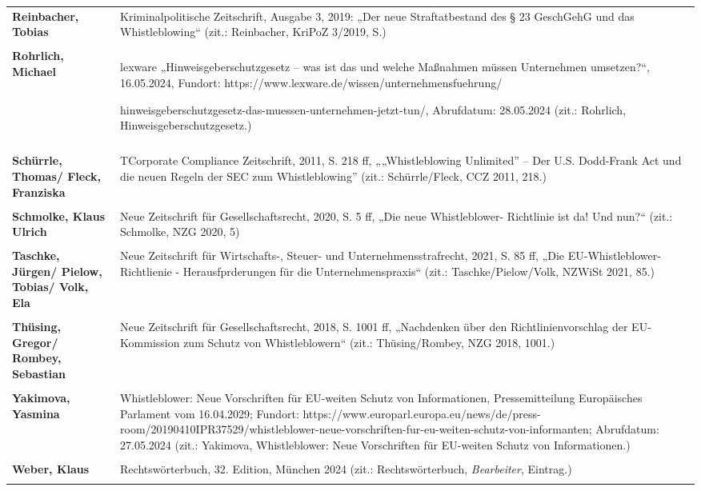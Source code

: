 \begin{longtable}{R{5 cm}R{8,5 cm}}
    \textbf{Reinbacher, Tobias} & Kriminalpolitische Zeitschrift, Ausgabe 3, 2019: „Der neue Straftatbestand des § 23 GeschGehG und das Whistleblowing“ (zit.: Reinbacher, KriPoZ 3/2019, S.) \\
    \\

    \textbf{Rohrlich, Michael} & lexware „Hinweisgeberschutzgesetz – was ist das und welche Maßnahmen müssen Unternehmen umsetzen?“, 16.05.2024, Fundort: https://www.lexware.de/wissen/unternehmensfuehrung/
    
    hinweisgeberschutzgesetz-das-muessen-unternehmen-jetzt-tun/, Abrufdatum: 28.05.2024 (zit.: Rohrlich, Hinweisgeberschutzgesetz.) \\
    \\

    \textbf{Schürrle, Thomas/ Fleck, Franziska} & TCorporate Compliance Zeitschrift, 2011, S. 218 ff, „„Whistleblowing Unlimited” – Der U.S. Dodd-Frank Act und die neuen Regeln der SEC zum Whistleblowing” (zit.: Schürrle/Fleck, CCZ 2011, 218.) \\
    \\

    \textbf{Schmolke, Klaus Ulrich} & Neue Zeitschrift für Gesellschaftsrecht, 2020, S. 5 ff, „Die neue Whistleblower- Richtlinie ist da! Und nun?“ (zit.: Schmolke, NZG 2020, 5) \\
    \\

    \textbf{Taschke, Jürgen/ Pielow, Tobias/ Volk, Ela} & Neue Zeitschrift für Wirtschafts-, Steuer- und Unternehmensstrafrecht, 2021, S. 85 ff, „Die EU-Whistleblower-Richtlienie - Herausfprderungen für die Unternehmenspraxis“ (zit.: Taschke/Pielow/Volk, NZWiSt 2021, 85.) \\
    \\

    \textbf{Thüsing, Gregor/ Rombey, Sebastian} & Neue Zeitschrift für Gesellschaftsrecht, 2018, S. 1001 ff, „Nachdenken über den Richtlinienvorschlag der EU-Kommission zum Schutz von Whistleblowern“ (zit.: Thüsing/Rombey, NZG 2018, 1001.) \\
    \\

    \textbf{Yakimova, Yasmina} & Whistleblower: Neue Vorschriften für EU-weiten Schutz von Informationen, Pressemitteilung Europäisches Parlament vom 16.04.2029; Fundort: https://www.europarl.europa.eu/news/de/press-room/20190410IPR37529/whistleblower-neue-vorschriften-fur-eu-weiten-schutz-von-informanten; Abrufdatum: 27.05.2024 (zit.: Yakimova, Whistleblower: Neue Vorschriften für EU-weiten Schutz von Informationen.) \\
    \\

    \textbf{Weber, Klaus} & Rechtswörterbuch, 32. Edition, München 2024 (zit.: Rechtswörterbuch, \textit{Bearbeiter}, Eintrag.) \\
    \\
    
\end{longtable}
